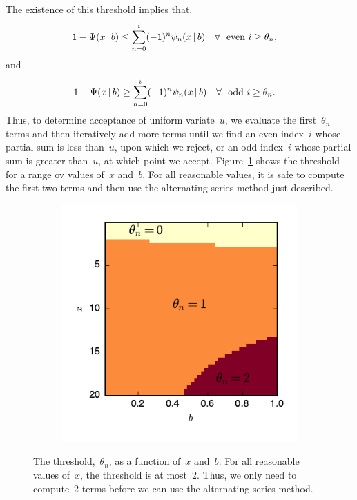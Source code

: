 \documentclass[aos,preprint]{imsart}
\begin{document}
The existence of this threshold implies that,
\begin{align}
1 - \Psi(x \given b) &\leq \sum_{n=0}^i (-1)^n \psi_n(x \given b) \quad \forall~\text{ even } i \geq \theta_n,
\end{align} 
and
\begin{align}
1 - \Psi(x \given b) &\geq \sum_{n=0}^i (-1)^n \psi_n(x \given b) \quad \forall~\text{ odd } i \geq \theta_n.
\end{align} 
Thus, to determine acceptance of uniform variate~$u$, we evaluate the
first~$\theta_n$ terms and then iteratively add more terms until we find an
even index~$i$ whose partial sum is less than~$u$, upon which we
reject, or an odd index~$i$ whose partial sum is greater than~$u$, at
which point we accept.
Figure~\ref{fig:theta_n} shows the threshold for a range ov values of~$x$ 
and~$b$. For all reasonable values, it is safe to compute the first two
terms and then use the alternating series method just described.

\begin{figure}
\centering
  \begin{subfigure}[t]{3in}
    \centering
    \vskip 0pt
    \includegraphics[width=\textwidth]{n_threshold}
  \end{subfigure}
  \vspace{-2em}
  \caption{The threshold,~$\theta_n$, as a function of~$x$ and~$b$. For all reasonable 
  values of~$x$, the threshold is at most~$2$. Thus, we only need to compute~2 terms 
  before we can use the alternating series method.
}
\label{fig:theta_n}
\end{figure}
\end{document}
